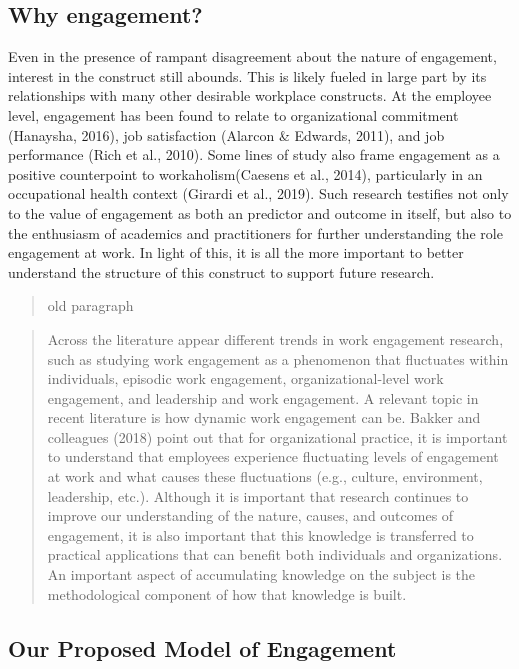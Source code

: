 \documentclass[
  english,
  man]{apa7}
\begin{document}
\hypertarget{why-engagement}{%
\subsection{Why engagement?}\label{why-engagement}}

Even in the presence of rampant disagreement about the nature of engagement, interest in the construct still abounds. This is likely fueled in large part by its relationships with many other desirable workplace constructs. At the employee level, engagement has been found to relate to organizational commitment (Hanaysha, 2016), job satisfaction (Alarcon \& Edwards, 2011), and job performance (Rich et al., 2010). Some lines of study also frame engagement as a positive counterpoint to workaholism(Caesens et al., 2014), particularly in an occupational health context (Girardi et al., 2019). Such research testifies not only to the value of engagement as both an predictor and outcome in itself, but also to the enthusiasm of academics and practitioners for further understanding the role engagement at work. In light of this, it is all the more important to better understand the structure of this construct to support future research.

\begin{quote}
old paragraph
\end{quote}

\begin{quote}
Across the literature appear different trends in work engagement research, such as studying work engagement as a phenomenon that fluctuates within individuals, episodic work engagement, organizational-level work engagement, and leadership and work engagement. A relevant topic in recent literature is how dynamic work engagement can be. Bakker and colleagues (2018) point out that for organizational practice, it is important to understand that employees experience fluctuating levels of engagement at work and what causes these fluctuations (e.g., culture, environment, leadership, etc.). Although it is important that research continues to improve our understanding of the nature, causes, and outcomes of engagement, it is also important that this knowledge is transferred to practical applications that can benefit both individuals and organizations. An important aspect of accumulating knowledge on the subject is the methodological component of how that knowledge is built.
\end{quote}

\hypertarget{our-proposed-model-of-engagement}{%
\subsection{Our Proposed Model of Engagement}\label{our-proposed-model-of-engagement}}
\end{document}
